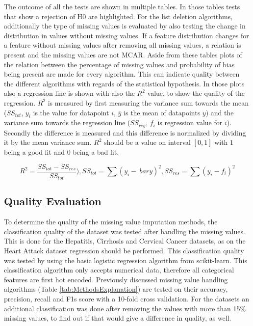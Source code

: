 \documentclass[10pt,a4paper]{article}
\begin{document}
	The outcome of all the tests are shown in multiple tables. In those tables tests that show a rejection of H0 are highlighted. For the list deletion algorithms, additionally the type of missing values is evaluated by also testing the change in distribution in values without missing values. If a feature distribution changes for a feature without missing values after removing all missing values, a relation is present and the missing values are not MCAR. Aside from these tables plots of the relation between the percentage of missing values and probability of bias being present are made for every algorithm. This can indicate quality between the different algorithms with regards of the statistical hypothesis. In those plots also a regression line is shown with also the $R^2$ value, to show the quality of the regression\cite{draper2014applied}. $R^2$ is measured by first measuring the variance sum towards the mean ($SS_{tot}$, $y_i$ is the value for datapoint $i$, $\bar{y}$ is the mean of datapoints $y$) and the variance sum towards the regression line ($SS_{reg}$, $f_i$ is regression value for $i$). Secondly the difference is measured and this difference is normalized by dividing it by the mean variance sum. $R^2$ should be a value on interval $[0, 1]$ with $1$ being a good fit and $0$ being a bad fit.
	
	\begin{equation}
	R^2 = \frac{SS_{tot} - SS_{res}}{SS_{tot}}), SS_{tot} = \sum(y_i -\ bar{y})^2, SS_{res} = \sum(y_i - f_i)^2 
	\end{equation} 

	\subsection{Quality Evaluation}
	\label{subsec:QualityEvaluation}
	
	To determine the quality of the missing value imputation methods, the classification quality of the dataset was tested after handling the missing values. This is done for the Hepatitis, Cirrhosis and Cervical Cancer datasets, as on the Heart Attack dataset regression should be performed. This classification quality was tested by using the basic logistic regression algorithm from scikit-learn. This classification algorithm only accepts numerical data, therefore all categorical features are first hot encoded. Previously discussed missing value handling algorithms (Table \ref{tab:MethodsExplanation}) are tested on their accuracy, precision, recall and F1s score with a 10-fold cross validation. For the datasets an additional classification was done after removing the values with more than 15\% missing values, to find out if that would give a difference in quality, as well. 
	
\end{document}
